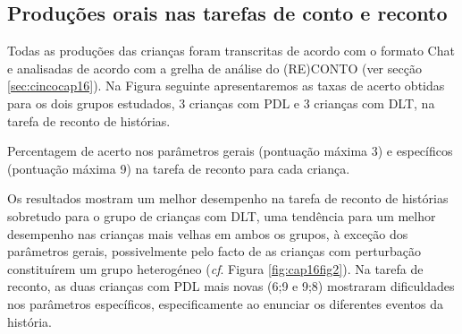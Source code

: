 \documentclass[output=paper,colorlinks,citecolor=brown,booklanguage=portuguese]{langscibook}
\begin{document}
\subsection{Produções orais nas tarefas de conto e reconto} Todas as produções das crianças foram transcritas de acordo com o formato Chat \citep{MacWhinney2000} e analisadas de acordo com a grelha de análise do (RE)CONTO (ver secção \ref{sec:cincocap16}). Na Figura seguinte apresentaremos as taxas de acerto obtidas para os dois grupos estudados, 3 crianças com PDL e 3 crianças com DLT, na tarefa de reconto de histórias.
\begin{Figura}

        \dataset


    \caption{{Percentagem de acerto nos parâmetros gerais (pontuação máxima 3) e específicos (pontuação máxima 9) na tarefa de reconto para cada criança.}}
    \label{fig:cap16fig2}
\end{Figura}

Os resultados mostram um melhor desempenho na tarefa de reconto de histórias sobretudo para o grupo de crianças com DLT, uma tendência para um melhor desempenho nas crianças mais velhas em ambos os grupos, à exceção dos parâmetros gerais, possivelmente pelo facto de as crianças com perturbação constituírem um grupo heterogéneo (\emph{cf}. Figura \ref{fig:cap16fig2}). Na tarefa de reconto, as duas crianças com PDL mais novas (6;9 e 9;8) mostraram dificuldades nos parâmetros específicos, especificamente ao enunciar os diferentes eventos da história.
\end{document}
